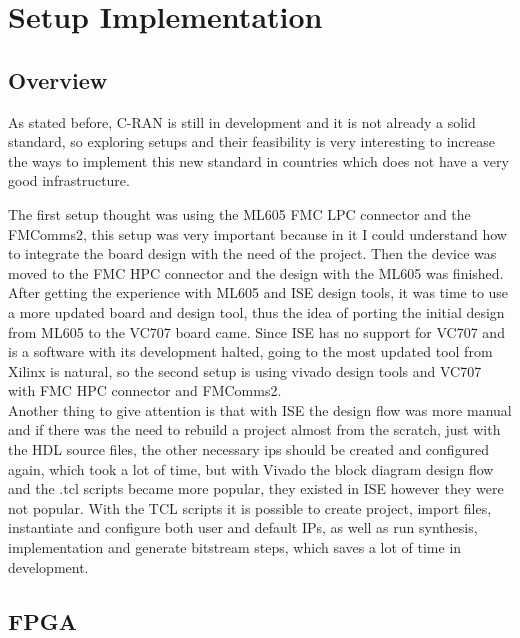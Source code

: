 \chapter{Setup Implementation}

\section{Overview}

As stated before, C-RAN is still in development and it is not already a solid
standard, so exploring setups and their feasibility is very interesting to
increase the ways to implement this new standard in countries which does not
have a very good infrastructure.

The first setup thought was using the ML605 FMC LPC connector and the FMComms2,
this setup was very important because in it I could understand how to integrate
the board design with the need of the project. Then the device was moved to the
FMC HPC connector and the design with the ML605 was finished.\\

After getting the experience with ML605 and ISE design tools, it was time to use
a more updated board and design tool, thus the idea of porting the initial
design from ML605 to the VC707 board came. Since ISE has no support for VC707
and is a software with its development halted, going to the most updated tool
from Xilinx is natural, so the second setup is using vivado design tools and
VC707 with FMC HPC connector and FMComms2.\\

Another thing to give attention is that with ISE the design flow was more manual
and if there was the need to rebuild a project almost from the scratch, just
with the HDL source files, the other necessary ips should be created and
configured again, which took a lot of time, but with Vivado the block diagram
design flow and the .tcl scripts became more popular, they existed in ISE
however they were not popular. With the TCL scripts it is possible to create
project, import files, instantiate and configure both user and default IPs, as
well as run synthesis, implementation and generate bitstream steps, which saves
a lot of time in development.\\


\section{FPGA}

